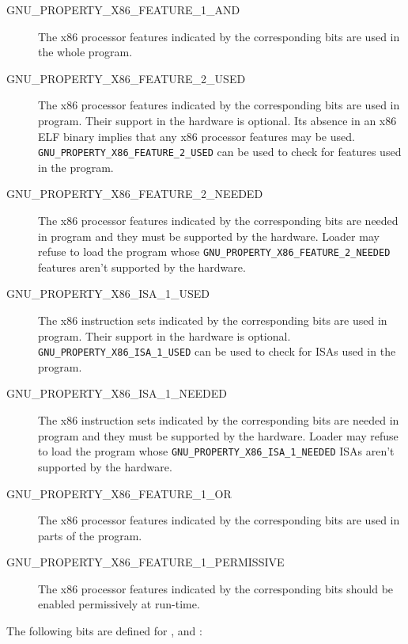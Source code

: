 \begin{description}
 \item[GNU_PROPERTY_X86_FEATURE_1_AND] The x86 processor features
   indicated by the corresponding bits are used in the whole program.
 \item[GNU_PROPERTY_X86_FEATURE_2_USED] The x86 processor features
   indicated by the corresponding bits are used in program.  Their
   support in the hardware is optional.  Its absence in an x86 ELF
   binary implies that any x86 processor features may be used.
   \texttt{GNU_PROPERTY_X86_FEATURE_2_USED} can be used to check for
   features used in the program.
 \item[GNU_PROPERTY_X86_FEATURE_2_NEEDED] The x86 processor features
   indicated by the corresponding bits are needed in program and they
   must be supported by the hardware.  Loader may refuse to load
   the program whose \texttt{GNU_PROPERTY_X86_FEATURE_2_NEEDED}
   features aren't supported by the hardware.
 \item[GNU_PROPERTY_X86_ISA_1_USED] The x86 instruction sets indicated
   by the corresponding bits are used in program.  Their support in the
   hardware is optional.  \texttt{GNU_PROPERTY_X86_ISA_1_USED} can be
   used to check for ISAs used in the program.
 \item[GNU_PROPERTY_X86_ISA_1_NEEDED] The x86 instruction sets indicated
   by the corresponding bits are needed in program and they must be
   supported by the hardware.  Loader may refuse to load the program
   whose \texttt{GNU_PROPERTY_X86_ISA_1_NEEDED} ISAs aren't supported
   by the hardware.
 \item[GNU_PROPERTY_X86_FEATURE_1_OR] The x86 processor features
   indicated by the corresponding bits are used in parts of the program.
 \item[GNU_PROPERTY_X86_FEATURE_1_PERMISSIVE] The x86 processor features
   indicated by the corresponding bits should be enabled permissively
   at run-time.
\end{description}

The following bits are defined for ,
 and
:

